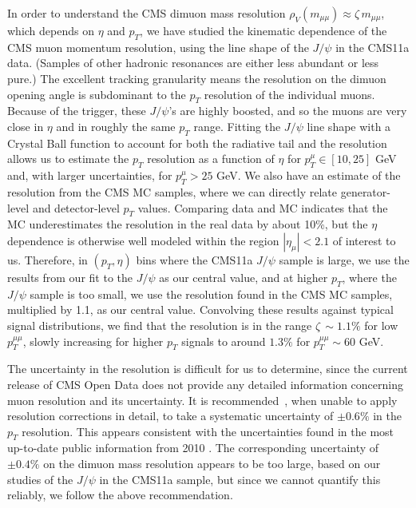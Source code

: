 \documentclass[aps,prd,twocolumn,superscriptaddress,preprintnumbers,nofootinbib,longbibliography,floatfix]{revtex4-1}
\newcommand{\ptmm}{p_T^{\mu\mu}}
\begin{document}
In order to understand the CMS dimuon mass resolution $\rho_V(m_{\mu\mu})\approx \zeta\, m_{\mu\mu}$, which depends on $\eta$ and $p_T$,
we have studied the kinematic dependence of the CMS muon momentum resolution, using the line shape of the $J/\psi$ in the CMS11a data.  
%
(Samples of other hadronic resonances are either less abundant or less pure.)
%
The excellent tracking granularity means the resolution on the dimuon opening angle is subdominant to the $p_T$ resolution of the individual muons.
%
Because of the trigger, these $J/\psi$'s are highly boosted, and so the muons are very close in $\eta$ and in roughly the same $p_T$ range.
%
Fitting the $J/\psi$ line shape with a Crystal Ball function to account for both the radiative tail and the resolution allows us to estimate the $p_T$ resolution as a function of $\eta$ for $p_T^\mu\in[10,25]$ GeV and, with larger uncertainties, for $p^\mu_T > 25$ GeV. 
%
We also have an estimate of the resolution from the CMS MC samples, where we can directly relate generator-level and detector-level $p_T$ values.
%
Comparing data and MC indicates that the MC underestimates the resolution in the real data by about 10\%, but the $\eta$ dependence is otherwise well modeled within the region $|\eta_\mu|<2.1$ of interest to us.
%
Therefore, in $(p_T,\eta)$ bins where the CMS11a $J/\psi$ sample is large, we use the results from our fit to the $J/\psi$ as our central value, and at higher $p_T$, where the $J/\psi$ sample is too small, we use the resolution found in the CMS MC samples, multiplied by 1.1, as our central value.
%
Convolving these results against typical signal distributions, we find that the resolution is in the range $\zeta\,\sim 1.1\%$ for low $\ptmm$, slowly increasing for higher $p_T$ signals to around $1.3\%$ for $\ptmm\sim 60$ GeV.

The uncertainty in the resolution is difficult for us to determine, since the current release of CMS Open Data does not provide any detailed information concerning muon resolution and its uncertainty.
%
It is recommended~\cite{CERNOpenDataMuonRecommendations}, when unable to apply resolution corrections in detail, to take a systematic uncertainty of $\pm 0.6 \%$ in the $p_T$ resolution.
%
This appears consistent with the uncertainties found in the most up-to-date public information from 2010 \cite{Chatrchyan:2012xi}.
%
The corresponding uncertainty of $\pm0.4\%$ on the dimuon mass resolution appears to be too large, based on our studies of the $J/\psi$ in the CMS11a sample, but since we cannot quantify this reliably, we follow the above recommendation.
\end{document}
